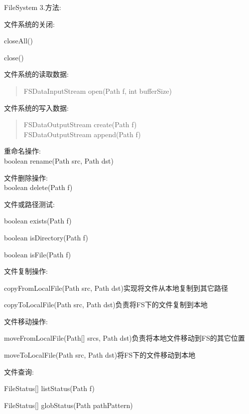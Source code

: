 \begin{XeClass}{FileSystem}
 3.方法:
 
 文件系统的关闭:
 \begin{XeEnum}
 \item closeAll()
 \item close()
 \end{XeEnum}
 
 文件系统的读取数据:
 \begin{quote}
 FSDataInputStream open(Path f, int bufferSize)
 \end{quote}
 
 文件系统的写入数据:
 \begin{quote}
 FSDataOutputStream create(Path f) \\
 FSDataOutputStream append(Path f) 
 \end{quote}
 
 重命名操作: \\
 boolean rename(Path src, Path dst)
 
 文件删除操作: \\
 boolean delete(Path f)
 
 文件或路径测试: \\
 \begin{XeEnum}
 \item boolean exists(Path f)
 \item boolean isDirectory(Path f)
 \item boolean isFile(Path f)
 \end{XeEnum}
 
 文件复制操作:
 \begin{XeEnum}
 \item copyFromLocalFile(Path src, Path dst)实现将文件从本地复制到其它路径
 \item copyToLocalFile(Path src, Path dst)负责将FS下的文件复制到本地
 \end{XeEnum}
 
 文件移动操作: \\
 \begin{XeEnum}
 \item moveFromLocalFile(Path[] srcs, Path dst)负责将本地文件移动到FS的其它位置
 \item moveToLocalFile(Path src, Path dst)将FS下的文件移动到本地
 \end{XeEnum}
  
 文件查询: \\
 \begin{XeEnum}
 \item FileStatus[] listStatus(Path f)
 \item FileStatus[] globStatus(Path pathPattern)
 \end{XeEnum}
  

\end{XeClass}
